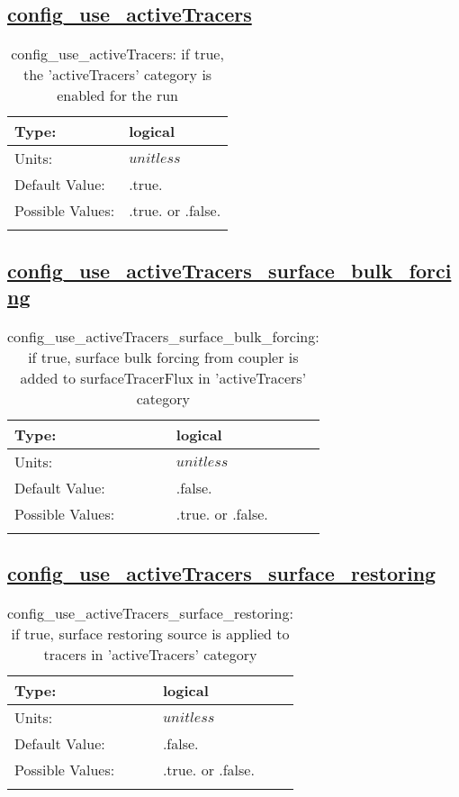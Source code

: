 \subsection[config\_use\_activeTracers]{\hyperref[sec:nm_tab_tracer_forcing_activeTracers]{config\_use\_activeTracers}}
\label{subsec:nm_sec_config_use_activeTracers}
\begin{center}
\begin{longtable}{| p{2.0in} || p{4.0in} |}
    \hline
    Type: & logical \\
    \hline
    Units: & $unitless$ \\
    \hline
    Default Value: & .true. \\
    \hline
    Possible Values: & .true. or .false. \\
    \hline
    \caption{config\_use\_activeTracers: if true, the 'activeTracers' category is enabled for the run}
\end{longtable}
\end{center}
\subsection[config\_use\_activeTracers\_surface\_bulk\_forcing]{\hyperref[sec:nm_tab_tracer_forcing_activeTracers]{config\_use\_activeTracers\_surface\_bulk\_forcing}}
\label{subsec:nm_sec_config_use_activeTracers_surface_bulk_forcing}
\begin{center}
\begin{longtable}{| p{2.0in} || p{4.0in} |}
    \hline
    Type: & logical \\
    \hline
    Units: & $unitless$ \\
    \hline
    Default Value: & .false. \\
    \hline
    Possible Values: & .true. or .false. \\
    \hline
    \caption{config\_use\_activeTracers\_surface\_bulk\_forcing: if true, surface bulk forcing from coupler is added to surfaceTracerFlux in 'activeTracers' category}
\end{longtable}
\end{center}
\subsection[config\_use\_activeTracers\_surface\_restoring]{\hyperref[sec:nm_tab_tracer_forcing_activeTracers]{config\_use\_activeTracers\_surface\_restoring}}
\label{subsec:nm_sec_config_use_activeTracers_surface_restoring}
\begin{center}
\begin{longtable}{| p{2.0in} || p{4.0in} |}
    \hline
    Type: & logical \\
    \hline
    Units: & $unitless$ \\
    \hline
    Default Value: & .false. \\
    \hline
    Possible Values: & .true. or .false. \\
    \hline
    \caption{config\_use\_activeTracers\_surface\_restoring: if true, surface restoring source is applied to tracers in 'activeTracers' category}
\end{longtable}
\end{center}
